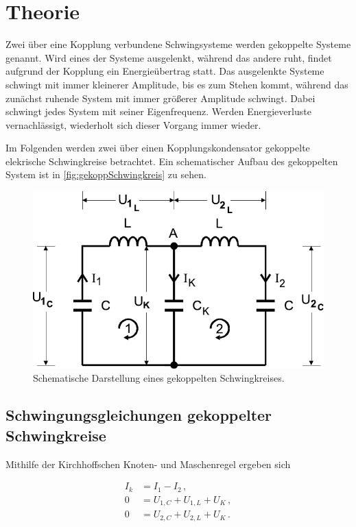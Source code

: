 \section{Theorie}
\label{sec:Theorie}

Zwei über eine Kopplung verbundene Schwingsysteme werden gekoppelte Systeme genannt.
Wird eines der Systeme ausgelenkt, während das andere ruht, findet aufgrund der Kopplung ein Energieübertrag statt. Das ausgelenkte Systeme schwingt mit immer kleinerer Amplitude, bis es zum Stehen kommt, während 
das zunächst ruhende System mit immer größerer Amplitude schwingt. Dabei schwingt jedes System mit seiner Eigenfrequenz. Werden Energieverluste vernachlässigt, wiederholt sich dieser Vorgang immer wieder.

Im Folgenden werden zwei über einen Kopplungskondensator gekoppelte elekrische Schwingkreise betrachtet. Ein schematischer Aufbau des gekoppelten System ist in \autoref{fig:gekoppSchwingkreis} zu sehen.

\begin{figure}[H]
    \centering
    \includegraphics{SchwingkreisAbb.pdf}
    \caption{Schematische Darstellung eines gekoppelten Schwingkreises\cite{ap04}.}
    \label{fig:gekoppSchwingkreis}
\end{figure}

\newpage

\subsection{Schwingungsgleichungen gekoppelter Schwingkreise}

Mithilfe der Kirchhoffschen Knoten- und Maschenregel ergeben sich

\begin{align*}
    I_k &= I_1-I_2\, ,\\
    0   &= U_{1,C} + U_{1,L} + U_K\, , \\ 
    0   &= U_{2,C} + U_{2,L} + U_K\,.
\end{align*}

